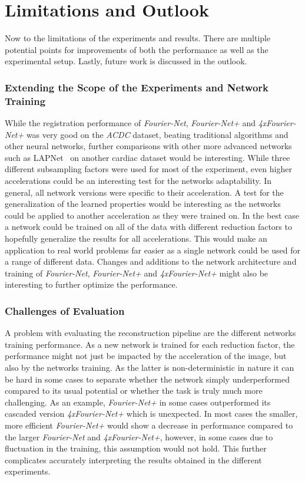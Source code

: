 \section{Limitations and Outlook} \label{Sec:LimitationsOutlook}
Now to the limitations of the experiments and results. There are multiple potential points for improvements of both the performance as well as the experimental setup. Lastly, future work is discussed in the outlook.

\subsubsection{Extending the Scope of the Experiments and Network Training} \label{SubSubSec:ExtendingScopeExperimentsNetworkTraining}
While the registration performance of \emph{Fourier-Net}, \emph{Fourier-Net+} and \emph{4xFourier-Net+} was very good on the \emph{ACDC} dataset, beating traditional algorithms and other neural networks, further comparisons with other more advanced networks such as LAPNet~\cite{LAPNet} on another cardiac dataset would be interesting. While three different subsampling factors were used for most of the experiment, even higher accelerations could be an interesting test for the networks adaptability. In general, all network versions were specific to their acceleration. A test for the generalization of the learned properties would be interesting as the networks could be applied to another acceleration as they were trained on. In the best case a network could be trained on all of the data with different reduction factors to hopefully generalize the results for all accelerations. This would make an application to real world problems far easier as a single network could be used for a range of different data. Changes and additions to the network architecture and training of \emph{Fourier-Net}, \emph{Fourier-Net+} and \emph{4xFourier-Net+} might also be interesting to further optimize the performance.

\subsubsection{Challenges of Evaluation} \label{SubSubSec:ChallengesEvaluation}
A problem with evaluating the reconstruction pipeline are the different networks training performance. As a new network is trained for each reduction factor, the performance might not just be impacted by the acceleration of the image, but also by the networks training. As the latter is non-deterministic in nature it can be hard in some cases to separate whether the network simply underperformed compared to its usual potential or whether the task is truly much more challenging. As an example, \emph{Fourier-Net+} in some cases outperformed its cascaded version \emph{4xFourier-Net+} which is unexpected. In most cases the smaller, more efficient \emph{Fourier-Net+} would show a decrease in performance compared to the larger \emph{Fourier-Net} and \emph{4xFourier-Net+}, however, in some cases due to fluctuation in the training, this assumption would not hold. This further complicates accurately interpreting the results obtained in the different experiments.

